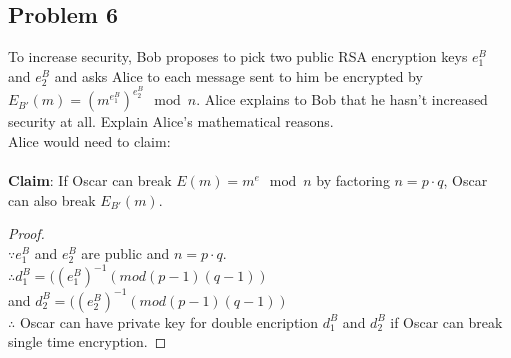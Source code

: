\documentclass[paper=a4, fontsize=11pt]{scrartcl} %
\numberwithin{equation}{section} %
\numberwithin{figure}{section} %
\newcommand{\problem}[1]{\subsection *{Problem #1}}
\newcommand{\claim}{\textbf{Claim}: }
\newcommand{\pnl}{$ $\newline\\}
\begin{document}
\problem 6
To increase security, Bob proposes to pick two public RSA encryption keys $e^B_1$ and $e^B_2$ and asks Alice to each message sent to him be encrypted by $E_{B'}(m) = (m^{e^B_1})^{e^B_2}\mod n$. Alice explains to Bob that he hasn't increased security at all. Explain Alice's mathematical reasons.\\
Alice would need to claim:\\\\
\claim If Oscar can break $E(m) = m^e \mod n$ by factoring $n = p \cdot q$, Oscar can also break $E_{B'}(m)$.
\begin{proof}
\pnl
$\because e^B_1$ and $e^B_2$ are public and $n = p \cdot q$.\\
$\therefore d^B_1 = ((e^B_1)^{-1} (mod (p - 1)(q - 1))$\\
and $d^B_2 = ((e^B_2)^{-1} (mod (p - 1)(q - 1))$\\
$\therefore$ Oscar can have private key for double encription $d^B_1$ and $d^B_2$ if Oscar can break single time encryption.
\end{proof}
\end{document}

